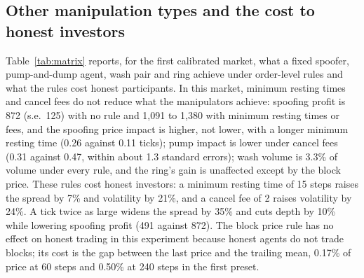 \documentclass[11pt,a4paper]{article}
\begin{document}
\begin{table}[t]
\centering\footnotesize
{}
\caption{Stock-level family of six calibrated markets (daily volatility 1.8--2.8\%): the ring's gain against each policy, as in Table~\ref{tab:ensemble}.}\label{tab:ensemblestock}
\end{table}

\subsection{Other manipulation types and the cost to honest investors}

Table~\ref{tab:matrix} reports, for the first calibrated market, what a fixed spoofer, pump-and-dump agent, wash pair and ring achieve under order-level rules and what the rules cost honest participants. In this market, minimum resting times and cancel fees do not reduce what the manipulators achieve: spoofing profit is 872 (s.e.\ 125) with no rule and 1,091 to 1,380 with minimum resting times or fees, and the spoofing price impact is higher, not lower, with a longer minimum resting time (0.26 against 0.11 ticks); pump impact is lower under cancel fees (0.31 against 0.47, within about 1.3 standard errors); wash volume is 3.3\% of volume under every rule, and the ring's gain is unaffected except by the block price. These rules cost honest investors: a minimum resting time of 15 steps raises the spread by 7\% and volatility by 21\%, and a cancel fee of 2 raises volatility by 24\%. A tick twice as large widens the spread by 35\% and cuts depth by 10\% while lowering spoofing profit (491 against 872). The block price rule has no effect on honest trading in this experiment because honest agents do not trade blocks; its cost is the gap between the last price and the trailing mean, 0.17\% of price at 60 steps and 0.50\% at 240 steps in the first preset.

\begin{table}[t]
\centering\scriptsize
\setlength{\tabcolsep}{3pt}
\caption{First calibrated market, 10 honest-only and 24 manipulated episodes per policy. Spread, depth, volatility, retail trading cost and volume are relative to the band-7\% market; spoofing and pump impact are in ticks; ``wash share'' is the share of volume traded between colluding accounts; ring gain is in tick-lots. Manipulators do not adapt. Retail cost includes fees paid; it falls under larger ticks and fees because simulated noise traders mostly post passive orders and earn the spread.}\label{tab:matrix}
\end{table}
\end{document}
